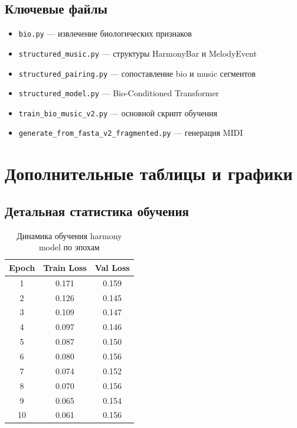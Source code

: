 \subsection{Ключевые файлы}

\begin{itemize}
\item \texttt{bio.py} — извлечение биологических признаков
\item \texttt{structured\_music.py} — структуры HarmonyBar и MelodyEvent
\item \texttt{structured\_pairing.py} — сопоставление bio и music сегментов
\item \texttt{structured\_model.py} — Bio-Conditioned Transformer
\item \texttt{train\_bio\_music\_v2.py} — основной скрипт обучения
\item \texttt{generate\_from\_fasta\_v2\_fragmented.py} — генерация MIDI
\end{itemize}

\section{Дополнительные таблицы и графики}

\subsection{Детальная статистика обучения}

\begin{table}[htbp]
\centering
\caption{Динамика обучения harmony model по эпохам}
\begin{tabular}{|c|c|c|}
\hline
\textbf{Epoch} & \textbf{Train Loss} & \textbf{Val Loss} \\
\hline
1 & 0.171 & 0.159 \\
2 & 0.126 & 0.145 \\
3 & 0.109 & 0.147 \\
4 & 0.097 & 0.146 \\
5 & 0.087 & 0.150 \\
6 & 0.080 & 0.156 \\
7 & 0.074 & 0.152 \\
8 & 0.070 & 0.156 \\
9 & 0.065 & 0.154 \\
10 & 0.061 & 0.156 \\
\hline
\end{tabular}
\end{table}

